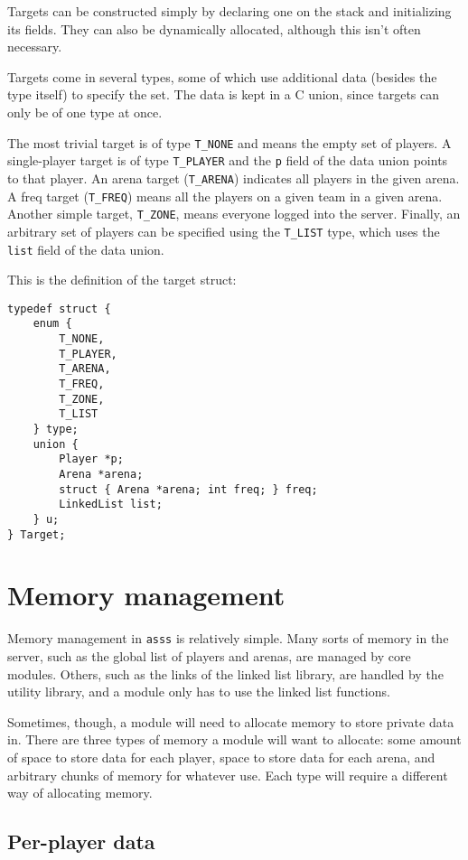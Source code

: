 \documentclass{article}
\newcommand{\asss}{\texttt{asss}}
\begin{document}
Targets can be constructed simply by declaring one on the stack and
initializing its fields. They can also be dynamically allocated,
although this isn't often necessary.

Targets come in several types, some of which use additional data
(besides the type itself) to specify the set. The data is kept in a
C union, since targets can only be of one type at once.

The most trivial target is of type \verb/T_NONE/ and means the empty set
of players. A single-player target is of type \verb/T_PLAYER/ and the
\verb/p/ field of the data union points to that player. An arena target
(\verb/T_ARENA/) indicates all players in the given arena. A freq target
(\verb/T_FREQ/) means all the players on a given team in a given arena.
Another simple target, \verb/T_ZONE/, means everyone logged into the
server. Finally, an arbitrary set of players can be specified using the
\verb/T_LIST/ type, which uses the \verb/list/ field of the data union.

This is the definition of the target struct:

\begin{verbatim}
typedef struct {
    enum {
        T_NONE,
        T_PLAYER,
        T_ARENA,
        T_FREQ,
        T_ZONE,
        T_LIST
    } type;
    union {
        Player *p;
        Arena *arena;
        struct { Arena *arena; int freq; } freq;
        LinkedList list;
    } u;
} Target;
\end{verbatim}


\section{Memory management}

Memory management in \asss{} is relatively simple. Many sorts of memory
in the server, such as the global list of players and arenas, are
managed by core modules. Others, such as the links of the linked list
library, are handled by the utility library, and a module only has to
use the linked list functions.

Sometimes, though, a module will need to allocate memory to store
private data in. There are three types of memory a module will want to
allocate: some amount of space to store data for each player, space to
store data for each arena, and arbitrary chunks of memory for whatever
use. Each type will require a different way of allocating memory.

\subsection{Per-player data}
\end{document}
